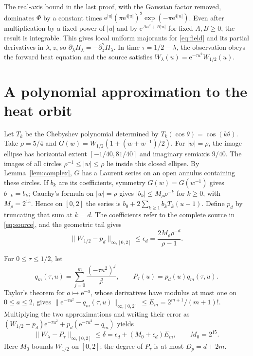 \documentclass[11pt]{article}
\newcommand{\e}{\mathrm e}
\begin{document}
The real-axis bound in the last proof, with the Gaussian factor removed,
dominates \(\Phi\) by a constant times
\(\e^{|u|}(\pi\e^{4|u|})^2\exp(-\pi\e^{4|u|})\).
Even after multiplication by a fixed power of \(|u|\) and by
\(\e^{A u^2+B|u|}\) for fixed \(A,B\ge0\), the result is integrable.
This gives local uniform majorants for \eqref{eq:field} and its partial
derivatives in \(\lambda,z\), so
\(\partial_\lambda H_\lambda=-\partial_z^2 H_\lambda\).
In time \(\tau=1/2-\lambda\), the observation obeys the forward heat
equation and the source satisfies \(W_\lambda(u)=\e^{-\tau u^2}W_{1/2}(u)\).

\section{A polynomial approximation to the heat orbit}
\label{sec:polynomial}

Let \(T_k\) be the Chebyshev polynomial determined by
\(T_k(\cos\theta)=\cos(k\theta)\).
Take \(\rho=5/4\) and \(G(w)=W_{1/2}(1+(w+w^{-1})/2)\).
For \(|w|=\rho\), the image ellipse has horizontal extent
\([-1/40,81/40]\) and imaginary semiaxis \(9/40\). The images
of all circles \(\rho^{-1}\le |w|\le\rho\) lie inside this
closed ellipse. By Lemma~\ref{lem:complex}, \(G\) has a Laurent series
on an open annulus containing these circles. If \(b_k\) are its
coefficients, symmetry \(G(w)=G(w^{-1})\) gives \(b_{-k}=b_k\);
Cauchy's formula on \(|w|=\rho\) gives
\(|b_k|\le M_\rho\rho^{-k}\) for \(k\ge0\), with \(M_\rho=2^{15}\).
Hence on \([0,2]\) the series is
\(b_0+2\sum_{k\ge1}b_kT_k(u-1)\). Define \(p_d\) by
truncating that sum at \(k=d\). The coefficients refer to the
complete source in \eqref{eq:source}, and the geometric tail gives
\[
 \|W_{1/2}-p_d\|_{\infty,[0,2]}\le
 \epsilon_d=\frac{2M_\rho\rho^{-d}}{\rho-1}.
\]

For \(0\le\tau\le1/2\), let
\[
 q_m(\tau,u)=\sum_{j=0}^m\frac{(-\tau u^2)^j}{j!},
 \qquad P_\tau(u)=p_d(u)q_m(\tau,u).
\]
Taylor's theorem for \(a\mapsto\e^{-a}\), whose derivatives have modulus
at most one on \(0\le a\le2\), gives
\(\|\e^{-\tau u^2}-q_m(\tau,u)\|_{\infty,[0,2]}\le E_m=2^{m+1}/(m+1)!\).
Multiplying the two approximations and writing their error as
\((W_{1/2}-p_d)\e^{-\tau u^2}+p_d(\e^{-\tau u^2}-q_m)\) yields
\begin{equation}
 \|W_\lambda-P_\tau\|_{\infty,[0,2]}\le
 \delta=\epsilon_d+(M_0+\epsilon_d)E_m,\qquad M_0=2^{15}.
 \label{eq:delta}
\end{equation}
Here \(M_0\) bounds \(W_{1/2}\) on \([0,2]\); the degree of \(P_\tau\)
is at most \(D_p=d+2m\).
\end{document}

